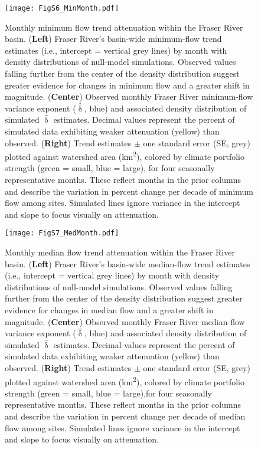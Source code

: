 \documentclass[draft,grl]{agutexSI}
\begin{document}
\begin{figure}[h]
	\centering
	\noindent\texttt{[image: FigS6\_MinMonth.pdf]}
	\caption{Monthly minimum flow trend attenuation within the Fraser River basin. (\textbf{Left}) Fraser River's basin-wide minimum-flow trend estimates (i.e., intercept = vertical grey lines) by month with density distributions of null-model simulations. Observed values falling further from the center of the density distribution suggest greater evidence for changes in minimum flow and a greater shift in magnitude. (\textbf{Center}) Observed monthly Fraser River minimum-flow variance exponent ($\hat{\updelta}$, blue) and associated density distribution of simulated $\hat{\updelta}$ estimates. Decimal values represent the percent of simulated data exhibiting weaker attenuation (yellow) than observed. (\textbf{Right}) Trend estimates $\pm$ one standard error (SE, grey) plotted against watershed area (km\textsuperscript{2}), colored by climate portfolio strength (green = small, blue = large), for four seasonally representative months. These reflect months in the prior columns and describe the variation in percent change per decade of minimum flow among sites. Simulated lines ignore variance in the intercept and slope to focus visually on attenuation.}
	\label{fig:S6}
\end{figure}

\begin{figure}[h]
	\centering
	\noindent\texttt{[image: FigS7\_MedMonth.pdf]}
	\caption{Monthly median flow trend attenuation within the Fraser River basin. (\textbf{Left}) Fraser River's basin-wide median-flow trend estimates (i.e., intercept = vertical grey lines) by month with density distributions of null-model simulations. Observed values falling further from the center of the density distribution suggest greater evidence for changes in median flow and a greater shift in magnitude. (\textbf{Center}) Observed monthly Fraser River median-flow variance exponent ($\hat{\updelta}$, blue) and associated density distribution of simulated $\hat{\updelta}$ estimates. Decimal values represent the percent of simulated data exhibiting weaker attenuation (yellow) than observed. (\textbf{Right}) Trend estimates $\pm$ one standard error (SE, grey) plotted against watershed area (km\textsuperscript{2}), colored by climate portfolio strength (green = small, blue = large),for four seasonally representative months. These reflect months in the prior columns and describe the variation in percent change per decade of median flow among sites. Simulated lines ignore variance in the intercept and slope to focus visually on attenuation.}
	\label{fig:S7}
\end{figure}
\end{document}
